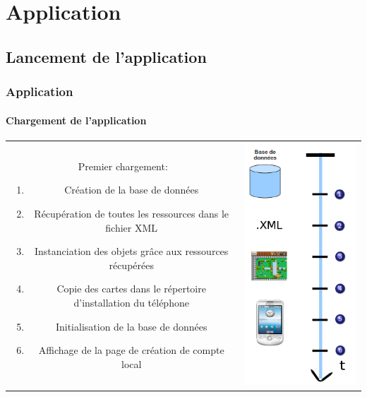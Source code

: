\section{Application}

\subsection{Lancement de l'application}


	\begin{frame}
	\frametitle{Application}
	\framesubtitle{Chargement de l'application}
	
	
	\begin{center}
		\begin{tabular}{cc}
			\begin{minipage}{8cm}
				Premier chargement:
				\begin{enumerate}
					\item Création de la base de données
					\item Récupération de toutes les ressources dans le fichier XML
					\item Instanciation des objets grâce aux ressources récupérées
					\item Copie des cartes dans le répertoire d'installation du téléphone
					\item Initialisation  de la base de données
					\item Affichage de la page de création de compte local
				\end{enumerate}
			\end{minipage} &
			\begin{minipage}{4cm}
				 \includegraphics[scale=0.35]{img/sequence_demarrage.png}
			\end{minipage}\\
		\end{tabular}
	\end{center}

	
	\end{frame}
	

